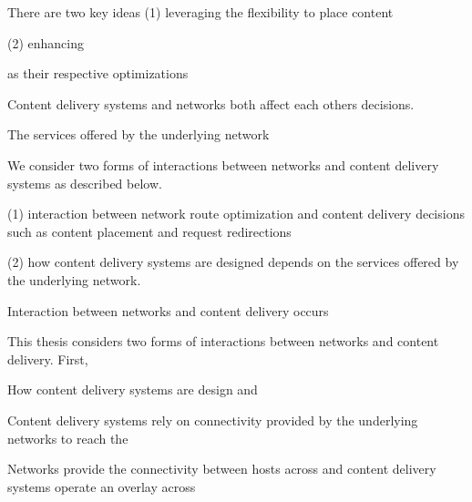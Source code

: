 There are two key ideas (1) leveraging the flexibility to place content 

(2) enhancing 

as their respective optimizations 

Content delivery systems and networks both affect each others decisions. 

The services offered by the underlying network 

We consider two forms of interactions between networks and content delivery systems as described below. 

(1) interaction between network route optimization and content delivery decisions such as content placement and request redirections 

(2) how content delivery systems are designed depends on the services offered by the underlying network.




Interaction between networks and content delivery occurs 

This thesis considers two forms of interactions between networks and content delivery. First, 


How content delivery systems are design and 

Content delivery systems rely on connectivity provided by the underlying networks to reach the  

Networks provide the connectivity between hosts across and content delivery systems operate an overlay across 

